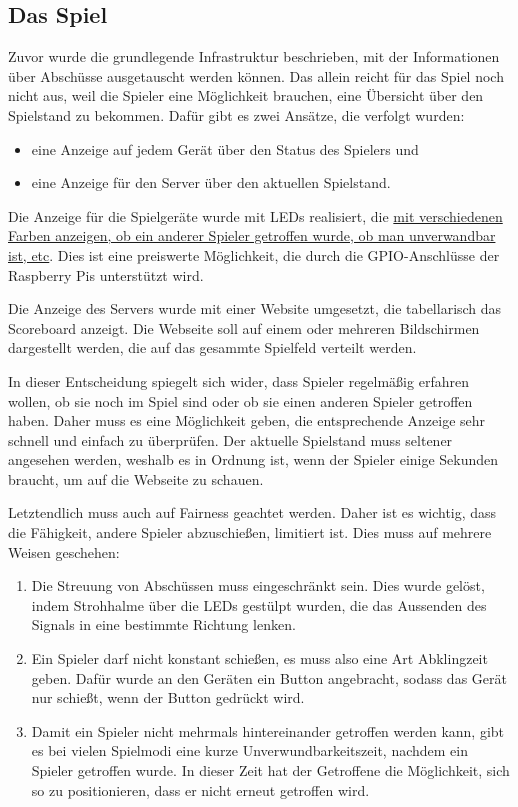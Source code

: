 \subsection{Das Spiel}
Zuvor wurde die grundlegende Infrastruktur beschrieben, mit der Informationen über Abschüsse
ausgetauscht werden können.
Das allein reicht für das Spiel noch nicht aus, weil die Spieler eine Möglichkeit brauchen, eine
Übersicht über den Spielstand zu bekommen.
Dafür gibt es zwei Ansätze, die verfolgt wurden:
\begin{itemize}
  \item
    eine Anzeige auf jedem Gerät über den Status des Spielers und
  \item
    eine Anzeige für den Server über den aktuellen Spielstand.
\end{itemize}
Die Anzeige für die Spielgeräte wurde mit LEDs realisiert, die \hyperref[led-anzeige]{mit
verschiedenen Farben anzeigen, ob ein anderer Spieler getroffen wurde, ob man unverwandbar ist,
etc}.
Dies ist eine preiswerte Möglichkeit, die durch die GPIO-Anschlüsse der Raspberry Pis unterstützt
wird.

Die Anzeige des Servers wurde mit einer Website umgesetzt, die tabellarisch das Scoreboard anzeigt.
Die Webseite soll auf einem oder mehreren Bildschirmen dargestellt werden, die auf das gesammte
Spielfeld verteilt werden.

In dieser Entscheidung spiegelt sich wider, dass Spieler regelmäßig erfahren wollen, ob sie noch im
Spiel sind oder ob sie einen anderen Spieler getroffen haben.
Daher muss es eine Möglichkeit geben, die entsprechende Anzeige sehr schnell und einfach zu
überprüfen.
Der aktuelle Spielstand muss seltener angesehen werden, weshalb es in Ordnung ist, wenn der Spieler
einige Sekunden braucht, um auf die Webseite zu schauen.

Letztendlich muss auch auf Fairness geachtet werden.
Daher ist es wichtig, dass die Fähigkeit, andere Spieler abzuschießen, limitiert ist.
Dies muss auf mehrere Weisen geschehen:
\begin{enumerate}
  \item
    Die Streuung von Abschüssen muss eingeschränkt sein.
    Dies wurde gelöst, indem Strohhalme über die LEDs gestülpt wurden, die das Aussenden des Signals
    in eine bestimmte Richtung lenken.
  \item
    Ein Spieler darf nicht konstant schießen, es muss also eine Art Abklingzeit geben.
    Dafür wurde an den Geräten ein Button angebracht, sodass das Gerät nur schießt, wenn der Button
    gedrückt wird.
  \item
    Damit ein Spieler nicht mehrmals hintereinander getroffen werden kann, gibt es bei vielen
    Spielmodi eine kurze Unverwundbarkeitszeit, nachdem ein Spieler getroffen wurde.
    In dieser Zeit hat der Getroffene die Möglichkeit, sich so zu positionieren, dass er nicht
    erneut getroffen wird.
\end{enumerate}
